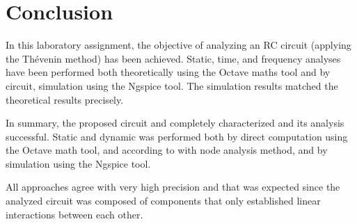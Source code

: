 \section{Conclusion}
\label{sec:conclusion}

In this laboratory assignment, the objective of analyzing an RC circuit (applying the Thévenin method) has been achieved. Static, time, and frequency analyses have been performed both theoretically using the Octave maths tool and by circuit, simulation using the Ngspice tool. The simulation results matched the theoretical results precisely. 

In summary, the proposed circuit and completely characterized and its analysis successful. Static and dynamic was performed both by direct computation using the Octave math tool, and according to with node analysis method, and by simulation using the Ngspice tool. 

All approaches agree with very high precision and that was expected since the analyzed circuit was composed of components that only established linear interactions between each other.


